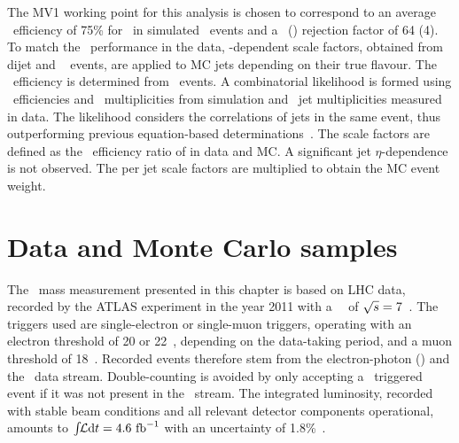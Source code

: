 %
The MV1 working point for this analysis is chosen to correspond to an average \btag\ efficiency of 75\% for \ in simulated \ttbar\ events and a \ljet\ (\cjet) rejection factor of 64 (4). 
To match the \btag\ performance in the data, \pt-dependent scale factors, obtained from dijet and \ttbarll~\cite{Aad:2015ydr} events, are applied to MC jets depending on their true flavour. 
%
The \btag\ efficiency is determined from \ttbarll\ events. A combinatorial likelihood is formed using \ljet\ efficiencies and \bquark\ multiplicities from simulation and \btagged\ jet multiplicities measured in data. The likelihood considers the correlations of jets in the same event, thus outperforming previous equation-based determinations~\cite{Aad:2015ydr}. The scale factors are defined as the \btag\ efficiency ratio of  in data and \gls{MC}. A significant jet $\eta$-dependence is not observed.
%
The per jet scale factors are multiplied to obtain the \gls{MC} event weight.
























\section{Data and Monte Carlo samples}
\label{sect:dataMC7TeV}
%
The \tquark\ mass measurement presented in this chapter is based on \gls{LHC} data, recorded by the \gls{ATLAS} experiment in the year 2011 with a \pp\ \cme\ of ${\sqrt{s}}=7$~\TeV. 
%
The triggers used are single-electron or single-muon triggers, operating with an electron threshold of 20 or 22~\GeV, depending on the data-taking period, and a muon threshold of 18~\GeV. Recorded events therefore stem from the electron-photon (\Egam) and the \Muon\ data stream. Double-counting is avoided by only accepting a \Muon\ triggered event if it was not present in the \Egam\ stream. 
%
The integrated luminosity, recorded with stable beam conditions and all relevant detector components operational, amounts to $\int\!\!{\mathcal L}\mathrm{d}t=4.6~\mathrm{fb}^{-1}$ with an uncertainty of 1.8\%~\cite{Aad:2013ucp}. 


